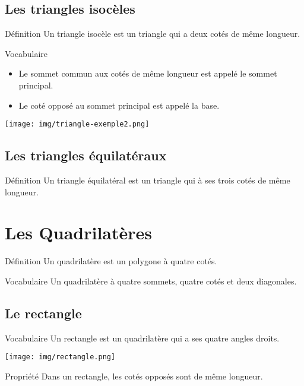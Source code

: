 \documentclass[12pt,a4paper]{article}
\begin{document}
\subsection{Les triangles isocèles}

\begin{minipage}{0.5\textwidth}
\begin{definition}{Définition}
Un triangle isocèle est un triangle qui a deux cotés de même longueur.
\end{definition}
\end{minipage}
\begin{minipage}{0.5\textwidth}
\begin{definition}{Vocabulaire}
\begin{itemize}
\item Le sommet commun 	aux cotés de même longueur est appelé le sommet principal.
\item Le coté opposé au sommet principal est appelé la base.
\end{itemize}
\end{definition}
\end{minipage}
\texttt{[image: img/triangle-exemple2.png]} 
\subsection{Les triangles équilatéraux}

\begin{definition}{Définition}
Un triangle équilatéral est un triangle qui à ses trois cotés de même longueur.
\end{definition}

\section{Les Quadrilatères}
\begin{minipage}{0.5\textwidth}
\begin{definition}{Définition}
Un quadrilatère est un polygone à quatre cotés.
\end{definition}
\end{minipage}
\begin{minipage}{0.5\textwidth}
\begin{definition}{Vocabulaire}
Un quadrilatère à quatre sommets, quatre cotés et deux diagonales.
\end{definition}
\end{minipage}
\subsection{Le rectangle}
\begin{definition}{Vocabulaire}
Un rectangle est un quadrilatère qui a ses quatre angles droits.
\end{definition}
\texttt{[image: img/rectangle.png]} 
\begin{definition}{Propriété}
Dans un rectangle, les cotés opposés sont de même longueur.
\end{definition}
\end{document}
